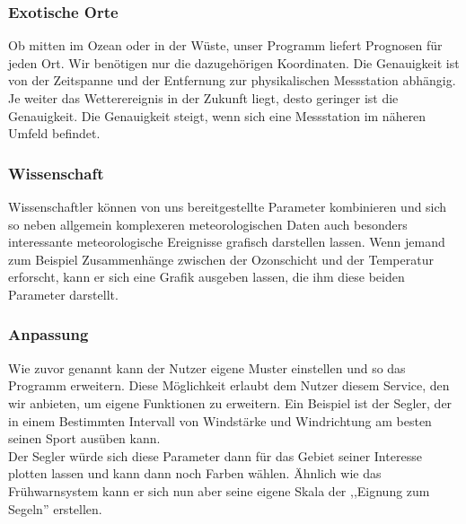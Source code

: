 \subsubsection{Exotische Orte} %
Ob mitten im Ozean oder in der Wüste, unser Programm liefert Prognosen für jeden Ort.
Wir benötigen nur die dazugehörigen Koordinaten.
Die Genauigkeit ist von der Zeitspanne und der Entfernung zur physikalischen Messstation abhängig.
Je weiter das Wetterereignis in der Zukunft liegt, desto geringer ist die Genauigkeit.
Die Genauigkeit steigt, wenn sich eine Messstation im näheren Umfeld befindet.

\subsubsection{Wissenschaft} %
Wissenschaftler können von uns bereitgestellte Parameter kombinieren und sich so neben allgemein komplexeren meteorologischen Daten auch besonders interessante meteorologische Ereignisse grafisch darstellen lassen.
Wenn jemand zum Beispiel Zusammenhänge zwischen der Ozonschicht und der Temperatur erforscht,
kann er sich eine Grafik ausgeben lassen, die ihm diese beiden Parameter darstellt.

\subsubsection{Anpassung} %
Wie zuvor genannt kann der Nutzer eigene Muster einstellen und so das Programm erweitern.
Diese Möglichkeit erlaubt dem Nutzer diesem Service, den wir anbieten, um eigene Funktionen zu erweitern.
Ein Beispiel ist der Segler, der in einem Bestimmten Intervall von Windstärke und Windrichtung am besten seinen Sport ausüben kann.\\
Der Segler würde sich diese Parameter dann für das Gebiet seiner Interesse plotten lassen und kann dann noch Farben wählen.
Ähnlich wie das Frühwarnsystem kann er sich nun aber seine eigene Skala der ,,Eignung zum Segeln'' erstellen.

